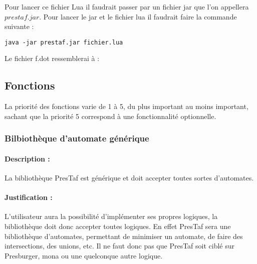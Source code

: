 \documentclass{article}%
\begin{document}
Pour lancer ce fichier Lua il faudrait passer par un fichier jar que l'on appellera $prestaf.jar$. Pour lancer le jar et le fichier lua il faudrait faire la commande suivante :

\begin{lstlisting}[mathescape=true, frame=single]
java -jar prestaf.jar fichier.lua
\end{lstlisting}

Le fichier f.dot ressemblerai à :


\subsection{Fonctions}

La priorité des fonctions varie de 1 à 5, du plus important au moins important, sachant que la priorité 5 correspond à une fonctionnalité optionnelle.

\subsubsection{Bilbiothèque d'automate générique}

\paragraph{Description :} La bibliothèque PresTaf est générique et doit accepter toutes sortes d'automates.

\paragraph{Justification :} L'utilisateur aura la possibilité d'implémenter ses propres logiques, la bibliothèque doit donc accepter toutes logiques. En effet PresTaf sera une bibliothèque d'automates, permettant de minimiser un automate, de faire des intersections, des unions, etc. Il ne faut donc pas que PresTaf soit ciblé sur Presburger, mona ou une quelconque autre logique.
\end{document}
